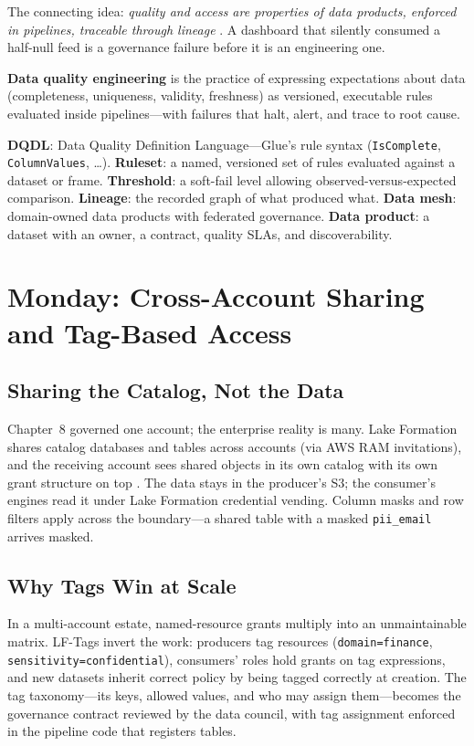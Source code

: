 The connecting idea: \emph{quality and access are properties of data products, enforced in pipelines, traceable through lineage} \cite{awsGlueDataQualityDocs,openLineage}. A dashboard that silently consumed a half-null feed is a governance failure before it is an engineering one.

\begin{definitionbox}
\textbf{Data quality engineering} is the practice of expressing expectations about data (completeness, uniqueness, validity, freshness) as versioned, executable rules evaluated inside pipelines---with failures that halt, alert, and trace to root cause.
\end{definitionbox}

\begin{keyterms}
\textbf{DQDL}: Data Quality Definition Language---Glue's rule syntax (\texttt{IsComplete}, \texttt{ColumnValues}, \ldots). \textbf{Ruleset}: a named, versioned set of rules evaluated against a dataset or frame. \textbf{Threshold}: a soft-fail level allowing observed-versus-expected comparison. \textbf{Lineage}: the recorded graph of what produced what. \textbf{Data mesh}: domain-owned data products with federated governance. \textbf{Data product}: a dataset with an owner, a contract, quality SLAs, and discoverability.
\end{keyterms}

\section{Monday: Cross-Account Sharing and Tag-Based Access}
\subsection{Sharing the Catalog, Not the Data}
Chapter~8 governed one account; the enterprise reality is many. Lake Formation shares catalog databases and tables across accounts (via AWS RAM invitations), and the receiving account sees shared objects in its own catalog with its own grant structure on top \cite{awsLakeFormationDocs}. The data stays in the producer's S3; the consumer's engines read it under Lake Formation credential vending. Column masks and row filters apply across the boundary---a shared table with a masked \texttt{pii\_email} arrives masked.

\subsection{Why Tags Win at Scale}
In a multi-account estate, named-resource grants multiply into an unmaintainable matrix. LF-Tags invert the work: producers tag resources (\texttt{domain=finance}, \texttt{sensitivity=confidential}), consumers' roles hold grants on tag expressions, and new datasets inherit correct policy by being tagged correctly at creation. The tag taxonomy---its keys, allowed values, and who may assign them---becomes the governance contract reviewed by the data council, with tag assignment enforced in the pipeline code that registers tables.

